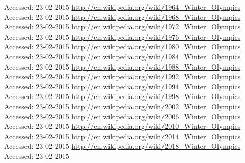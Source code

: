 \documentclass[11pt,a4paper]{article}
\begin{document}
\begin{thebibliography}{9}
  {Accessed: 23-02-2015}
  \url{http://en.wikipedia.org/wiki/1964_Winter_Olympics}\\
  {Accessed: 23-02-2015}
  \url{http://en.wikipedia.org/wiki/1968_Winter_Olympics}\\
  {Accessed: 23-02-2015}
  \url{http://en.wikipedia.org/wiki/1972_Winter_Olympics}\\
  {Accessed: 23-02-2015}
  \url{http://en.wikipedia.org/wiki/1976_Winter_Olympics}\\
  {Accessed: 23-02-2015}
  \url{http://en.wikipedia.org/wiki/1980_Winter_Olympics}\\
  {Accessed: 23-02-2015}
  \url{http://en.wikipedia.org/wiki/1984_Winter_Olympics}\\
  {Accessed: 23-02-2015}
  \url{http://en.wikipedia.org/wiki/1988_Winter_Olympics}\\
  {Accessed: 23-02-2015}
  \url{http://en.wikipedia.org/wiki/1992_Winter_Olympics}\\
  {Accessed: 23-02-2015}
  \url{http://en.wikipedia.org/wiki/1994_Winter_Olympics}\\
  {Accessed: 23-02-2015}
  \url{http://en.wikipedia.org/wiki/1998_Winter_Olympics}\\
  {Accessed: 23-02-2015}
  \url{http://en.wikipedia.org/wiki/2002_Winter_Olympics}\\
  {Accessed: 23-02-2015}
  \url{http://en.wikipedia.org/wiki/2006_Winter_Olympics}\\
  {Accessed: 23-02-2015}
  \url{http://en.wikipedia.org/wiki/2010_Winter_Olympics}\\
  {Accessed: 23-02-2015}
  \url{http://en.wikipedia.org/wiki/2014_Winter_Olympics}\\
  {Accessed: 23-02-2015}
  \url{http://en.wikipedia.org/wiki/2018_Winter_Olympics}\\
  {Accessed: 23-02-2015}
\end{thebibliography}
\end{document}
